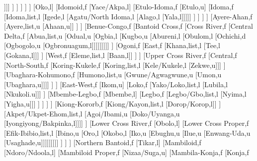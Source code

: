 \documentclass[landscape]{standalone}
\begin{document}
\begin{forest}
											[Kakanda,l
											[Kami,u
											[Kupa,l]]]]
										]%
									]%
								]%
							]%
						]%
						[Oko,l]
						[Idomoid,f
							[Yace/Akpa,l]
							[Etulo-Idoma,f
								[Etulo,u]
								[Idoma,f
									[Idoma,list,l
									[Igede,l
									[Agatu/North Idoma,l
									[Alago,l
									[Yala,l]]]]]
								]%
							]%
						]%
					]%
					[Ayere-Ahan,f
						[Ayere,list,u
						[Ahaan,u]]
					]%
				]%
				[Benue-Congo,f
					[Bantoid Cross,f
						[Cross River,f
							[Central Delta,f
								[Abua,list,u
								[Odual,u
								[Ogbia,l
								[Kugbo,u
								[Abureni,l
								[Obulom,l
								[Ochichi,d
								[Ogbogolo,u
								[Ogbronuagum,l]]]]]]]]]
							]%
							[Ogoni,f
								[East,f
									[Khana,list,l
									[Tee,l
									[Gokana,l]]]
								]%
								[West,f
									[Eleme,list,l
									[Baan,l]]
								]%
							]%
							[Upper Cross River,f
								[Central,f
									[North-South,f
										[Koring-Kukele,f
											[Koring,list,l
											[Kele/Kukele,l
											[Zekwe,u]]]
										]%
										[Ubaghara-Kohumono,f
											[Humono,list,u
											[Gwune/Agwagwune,u
											[Umon,u
											[Ubaghara,u]]]]
										]%
									]%
									[East-West,f
										[Ikom,u]
										[Loko,f
											[Yako/Loko,list,l
											[Lubila,l
											[Nkukoli.u]]]
										]%
										[Mbembe-Legbo,f
											[Mbembe,l]
											[Legbo,f
												[Legbo/Gbo,list,l
												[Nyima,l
												[Yigha,u]]]
											]%
										]%
									]%
								]%
								[Kiong-Kororb,f
									[Kiong/Kayon,list,l
									[Dorop/Korop,l]]
								]%
								[Akpet/Ukpet-Ehom,list,l
								[Agoi/Ibami,u
								[Doko/Uyanga,u
								[Iyongiyong/Bakpinka,l]]]]
							]%
							[Lower Cross River,f
								[Obolo,l]
								[Lower Cross Proper,f
									[Efik-Ibibio,list,l
									[Ibino,u
									[Oro,l
									[Okobo,l
									[Iko,u
									[Ebughu,u
									[Ilue,u
									[Enwang-Uda,u
									[Usaghade,u]]]]]]]]]
								]%
							]%
						]%
						[Northern Bantoid,f
							[Tikar,l]
							[Mambiloid,f
								[Ndoro/Ndoola,l]
								[Mambiloid Proper,f
									[Nizaa/Suga,u]
									[Mambila-Konja,f
										[Konja,f

\end{forest}
\end{document}
